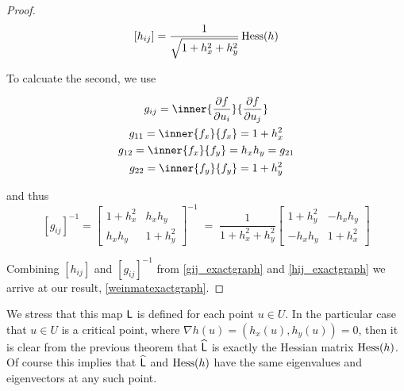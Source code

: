 \begin{proof}
	 \begin{equation} \label{hij_exactgraph}
	 [h_{ij}] = \frac{1}{\sqrt{1+h_x^2 + h_y^2}} \,  \mathrm{Hess} (h)
	 \end{equation}
	 
	 To calcuate the second, we use
	 
	 
	 
	 \begin{equation}
	 \begin{gathered}
	 g_{ij} = \inner{\frac{\partial f}{\partial u_i}}{\frac{\partial f}{\partial u_j}} \\
	 g_{11} = \inner{f_x}{f_x} = 1 + h_x^2 \\
	 g_{12} = \inner{f_x}{f_y} = h_x h_y = g_{21} \\
	 g_{22} = \inner{f_y}{f_y} = 1 + h_y^2
	 \end{gathered}
	 \end{equation}
	 
	 and thus
		\begin{equation} \label{gij_exactgraph}		 
		[g_{ij}]^{-1} = \begin{bmatrix} 1 + h_x^2 & h_x h_y \\
					h_x h_y & 1 + h_y^2 \end{bmatrix}^{-1}
					\;=\;	\frac{1}{1+h_x^2 +h_y^2}
					\begin{bmatrix} 1 + h_y^2 & -h_x h_y \\
					-	h_x h_y & 1 + h_x^2 \end{bmatrix}
		\end{equation}
       	
       	Combining $[h_{ij}]$ and $[g_{ij}]^{-1}$ from \cref{gij_exactgraph} and \cref{hij_exactgraph}
       	we arrive at our result, \cref{weinmatexactgraph}.
       	\end{proof}
       	
  We stress that this map $\mathsf{L}$ is defined for each point $u \in U$.
  In the particular case that $u \in  U$ is a critical point, where $\nabla h(u) = (h_x(u), h_y(u)) = 0$, then it is clear from the previous theorem that $\widehat{\mathsf{L}}$ is exactly the Hessian matrix $\mathrm{Hess}(h)$. Of course this implies that $\widehat{\mathsf{L}}$ and $\mathrm{Hess}{(h)}$ have the same eigenvalues and eigenvectors at any such point.

